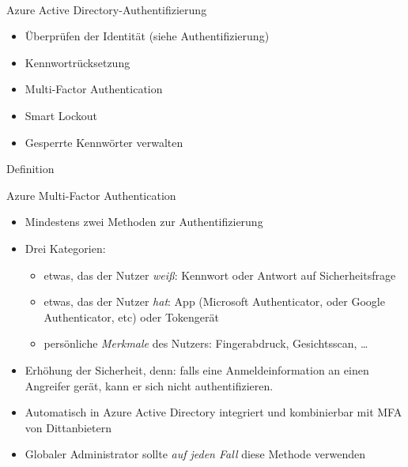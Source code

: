\documentclass{scrartcl}
\newenvironment{flashcard}[2][]{%
    #1
    \vfill
    \centerline{\Large{#2}}
    \vfill
\newpage
}
{\newpage}
\begin{document}
    \begin{flashcard}[\ ]{Azure Active Directory-Authentifizierung}
        \begin{itemize}
            \item Überprüfen der Identität
\newline(siehe Authentifizierung)
            \item Kennwortrücksetzung
            \item Multi-Factor Authentication
            \item Smart Lockout
            \item Gesperrte Kennwörter verwalten
        \end{itemize}
    \end{flashcard}

    \begin{flashcard}[Definition]{Azure Multi-Factor Authentication}
        \begin{itemize}
            \item Mindestens zwei Methoden zur Authentifizierung
            \item Drei Kategorien:
                \begin{itemize}
                    \item etwas, das der Nutzer \emph{weiß}: Kennwort oder Antwort auf Sicherheitsfrage
                    \item etwas, das der Nutzer \emph{hat}: App (Microsoft Authenticator, oder Google Authenticator, etc) oder Tokengerät
                    \item persönliche \emph{Merkmale} des Nutzers: Fingerabdruck, Gesichtsscan, \ldots
            \end{itemize}
            \item Erhöhung der Sicherheit, denn: falls eine Anmeldeinformation an einen Angreifer gerät, kann er sich nicht authentifizieren.
            \item Automatisch in Azure Active Directory integriert und kombinierbar mit MFA von Dittanbietern
            \item Globaler Administrator sollte \emph{auf jeden Fall} diese Methode verwenden
        \end{itemize}
    \end{flashcard}
\end{document}
